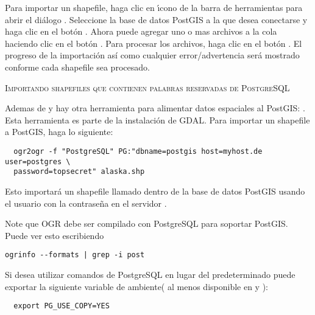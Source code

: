 Para importar un shapefile, haga clic en \'{\i}cono de la barra de herramientas  para abrir el di\'alogo . Seleccione la base de datos PostGIS a la que desea conectarse y haga clic en el bot\'on . Ahora puede agregar uno o mas archivos a la cola haciendo clic en el bot\'on   . Para procesar los archivos, haga clic en el bot\'on  
. El progreso de la importaci\'on as\'{i} como cualquier error/advertencia ser\'a mostrado conforme cada shapefile sea procesado.

\begin{Tip}\caption{\textsc{Importando shapefiles que contienen
palabras reservadas de PostgreSQL}}
\end{Tip} 

Ademas de  y  hay otra herramienta para alimentar datos espaciales al PostGIS: . Esta herramienta es parte de la instalaci\'on de GDAL.
Para importar un shapefile a PostGIS, haga lo siguiente:
\begin{verbatim}
  ogr2ogr -f "PostgreSQL" PG:"dbname=postgis host=myhost.de user=postgres \
  password=topsecret" alaska.shp
\end{verbatim}

Esto importar\'a un shapefile  llamado  dentro de la base de datos PostGIS
\usertext{postgis}
usando el usuario  con la contrase\~na  en el servidor
\server{myhost.de}.

Note que OGR debe ser compilado con PostgreSQL para soportar PostGIS.
Puede ver esto escribiendo
\begin{verbatim}
ogrinfo --formats | grep -i post
\end{verbatim}

Si desea utilizar comandos  de PostgreSQL  en lugar del predeterminado
\filename{INSERT INTO} puede exportar la siguiente variable de ambiente( al menos disponible en \nix y \osx):
\begin{verbatim}
  export PG_USE_COPY=YES
\end{verbatim}

